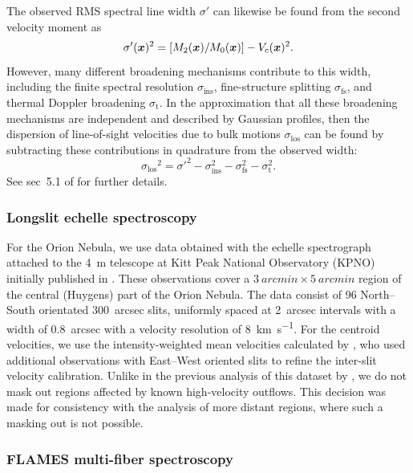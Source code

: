 \documentclass[fleqn,usenatbib, useAMS, a4paper]{mnras}
\newcommand\los{\ensuremath{_{\mathrm{los}}}}
\begin{document}
The observed RMS spectral line width \(\sigma'\) can likewise be found from
the second velocity moment as
\begin{equation}
  \label{eq:observed-sigma}
  \sigma'(\boldsymbol{x})^2  = [M_2(\boldsymbol{x}) / M_0(\boldsymbol{x})] - V_{c}(\boldsymbol{x})^2 .
\end{equation}
However, many different broadening mechanisms contribute to this width,
including the finite spectral resolution \(\sigma_{\mathrm{ins}}\),
fine-structure splitting \(\sigma_{\mathrm{fs}}\),
and thermal Doppler broadening \(\sigma_{\mathrm{t}}\).
In the approximation that all these broadening mechanisms are independent
and described by Gaussian profiles, then the dispersion of
line-of-sight velocities due to bulk motions \(\sigma\los\) can be found
by subtracting these contributions in quadrature from the observed width:
\begin{equation}
  \label{eq:sigma-los}
  \sigma\los^2 = \sigma'^2 - \sigma_{\mathrm{ins}}^2 - \sigma_{\mathrm{fs}}^2 - \sigma_{\mathrm{t}}^2 .
\end{equation}
See sec~5.1 of \citet{Garcia-Diaz:2008a} for further details.

\subsubsection{Longslit echelle spectroscopy}
\label{sec:longsl-echelle-spect}

For the Orion Nebula, we use data obtained with the echelle spectrograph attached to the \SI{4}{m} telescope at Kitt Peak National Observatory (KPNO) initially published in
\citet{Doi:2004a}.
These observations cover a \(\SI{3}{arcmin} \times \SI{5}{arcmin}\) region of the
central (Huygens) part of the Orion Nebula.
The data consist of 96 North--South orientated \SI{300}{arcsec} slits,
uniformly spaced at \SI{2}{arcsec} intervals with a width of \SI{0.8}{arcsec}
with a velocity resolution of \SI{8}{km.s^{-1}}. 
For the centroid velocities, we use the intensity-weighted 
mean velocities calculated by \citet{Garcia-Diaz:2008a},
who used additional observations with East--West oriented slits
to refine the inter-slit velocity calibration. 
Unlike in the previous analysis of this dataset by \citet{arthur2016turbulence},
we do not mask out regions affected by known high-velocity outflows.
This decision was made for consistency with the analysis of more distant regions,
where such a masking out is not possible.

\subsubsection{FLAMES multi-fiber spectroscopy}
\label{sec:flames-multi-fiber}
\end{document}

